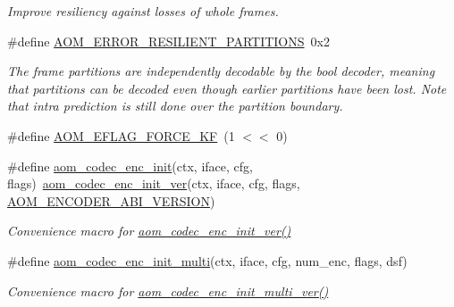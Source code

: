\begin{DoxyCompactItemize}
\begin{DoxyCompactList}\small\item\em Improve resiliency against losses of whole frames. \end{DoxyCompactList}\item 
\#define \hyperlink{group__encoder_gaec4a63bf8f03d0192644d0dcacf9f6ed}{A\+O\+M\+\_\+\+E\+R\+R\+O\+R\+\_\+\+R\+E\+S\+I\+L\+I\+E\+N\+T\+\_\+\+P\+A\+R\+T\+I\+T\+I\+O\+NS}~0x2\hypertarget{group__encoder_gaec4a63bf8f03d0192644d0dcacf9f6ed}{}\label{group__encoder_gaec4a63bf8f03d0192644d0dcacf9f6ed}

\begin{DoxyCompactList}\small\item\em The frame partitions are independently decodable by the bool decoder, meaning that partitions can be decoded even though earlier partitions have been lost. Note that intra prediction is still done over the partition boundary. \end{DoxyCompactList}\item 
\#define \hyperlink{group__encoder_ga86a6a9053205149cccc98481b5460337}{A\+O\+M\+\_\+\+E\+F\+L\+A\+G\+\_\+\+F\+O\+R\+C\+E\+\_\+\+KF}~(1 $<$$<$ 0)
\item 
\#define \hyperlink{group__encoder_gaade68a7d33d30f97dc9a596aa5e065d8}{aom\+\_\+codec\+\_\+enc\+\_\+init}(ctx,  iface,  cfg,  flags)~\hyperlink{group__encoder_ga205cf6f9460f4b4a842872012ef6fb0c}{aom\+\_\+codec\+\_\+enc\+\_\+init\+\_\+ver}(ctx, iface, cfg, flags, \hyperlink{group__encoder_gae4af664f2049d5b7d7b644d9a61d497c}{A\+O\+M\+\_\+\+E\+N\+C\+O\+D\+E\+R\+\_\+\+A\+B\+I\+\_\+\+V\+E\+R\+S\+I\+ON})
\begin{DoxyCompactList}\small\item\em Convenience macro for \hyperlink{group__encoder_ga205cf6f9460f4b4a842872012ef6fb0c}{aom\+\_\+codec\+\_\+enc\+\_\+init\+\_\+ver()} \end{DoxyCompactList}\item 
\#define \hyperlink{group__encoder_ga4410c689b0f8d0b75aca881ff7b25253}{aom\+\_\+codec\+\_\+enc\+\_\+init\+\_\+multi}(ctx,  iface,  cfg,  num\+\_\+enc,  flags,  dsf)
\begin{DoxyCompactList}\small\item\em Convenience macro for \hyperlink{group__encoder_gad3dfb2298402298abadb2c1b059b5f0b}{aom\+\_\+codec\+\_\+enc\+\_\+init\+\_\+multi\+\_\+ver()} \end{DoxyCompactList}\end{DoxyCompactItemize}
